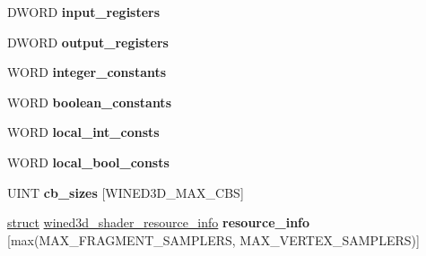 \begin{DoxyCompactItemize}
\begin{tabbing}
\end{tabbing}\item 
\mbox{\label{structwined3d__shader__reg__maps_a1fe6a1ca650285a97fd8f627685efe5b}} 
D\+W\+O\+RD {\bfseries input\+\_\+registers}
\item 
\mbox{\label{structwined3d__shader__reg__maps_ad8b4643abb7f35d80345ccb415068d7f}} 
D\+W\+O\+RD {\bfseries output\+\_\+registers}
\item 
\mbox{\label{structwined3d__shader__reg__maps_a0d8022ba908f82c6bfa5878a9a824c05}} 
W\+O\+RD {\bfseries integer\+\_\+constants}
\item 
\mbox{\label{structwined3d__shader__reg__maps_abc8e2e325c517fc3a1c957e7ea6d7d94}} 
W\+O\+RD {\bfseries boolean\+\_\+constants}
\item 
\mbox{\label{structwined3d__shader__reg__maps_abb32fb67af238e232f6f750f9e340f5f}} 
W\+O\+RD {\bfseries local\+\_\+int\+\_\+consts}
\item 
\mbox{\label{structwined3d__shader__reg__maps_a39258f55f10f4f9b675e10b287933f0a}} 
W\+O\+RD {\bfseries local\+\_\+bool\+\_\+consts}
\item 
\mbox{\label{structwined3d__shader__reg__maps_a0ea08a4bb638f6b04ada13a9fdbbca16}} 
U\+I\+NT {\bfseries cb\+\_\+sizes} \mbox{[}W\+I\+N\+E\+D3\+D\+\_\+\+M\+A\+X\+\_\+\+C\+BS\mbox{]}
\item 
\mbox{\label{structwined3d__shader__reg__maps_a77957f8f95eb318fd50b88666e3c79dd}} 
\hyperlink{interfacestruct}{struct} \hyperlink{structwined3d__shader__resource__info}{wined3d\+\_\+shader\+\_\+resource\+\_\+info} {\bfseries resource\+\_\+info} \mbox{[}max(M\+A\+X\+\_\+\+F\+R\+A\+G\+M\+E\+N\+T\+\_\+\+S\+A\+M\+P\+L\+E\+RS, M\+A\+X\+\_\+\+V\+E\+R\+T\+E\+X\+\_\+\+S\+A\+M\+P\+L\+E\+RS)\mbox{]}
\item 
\mbox{\label{structwined3d__shader__reg__maps_a830394e77de6232c4af18a13ae6f04de}} 

\end{DoxyCompactItemize}
